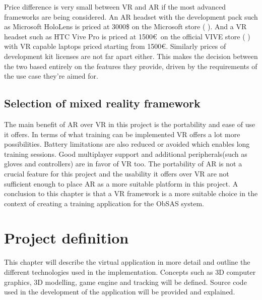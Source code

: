 \documentclass[12pt, a4paper,oneside, nocenter]{thesis}
\newcommand{\citeyeartitlexamkinline}[1]{(\usebibentry{#1}{title} \citeyear{#1})}
\begin{document}
\par
Price difference is very small between VR and AR if the most advanced frameworks are being considered. An AR headset with the development pack such as Microsoft HoloLens is priced at 3000\$ on the Microsoft store \citeyeartitlexamkinline{hololens-price}. And a VR headset such as HTC Vive Pro is priced at 1500\euro\ on the official VIVE store \citeyeartitlexamkinline{htc-vive-pro} with VR capable laptops priced starting from 1500\euro. Similarly prices of development kit licenses are not far apart either. This makes the decision between the two based entirely on the features they provide, driven by the requirements of the use case they're aimed for.
\par
\section{Selection of mixed reality framework}
The main benefit of AR over VR in this project is the portability and ease of use it offers. In terms of what training can be implemented VR offers a lot more possibilities. Battery limitations are also reduced or avoided which enables long training sessions. Good multiplayer support and additional peripherals(such as gloves and controllers) are in favor of VR too. The portability of AR is not a crucial feature for this project and the usability it offers over VR are not sufficient enough to place AR as a more suitable platform in this project. A conclusion to this chapter is that a VR framework is a more suitable choice in the context of creating a training application for the ObSAS system.
\par
\chapter{\texorpdfstring{Project definition}{proj-def}}
This chapter will describe the virtual application in more detail and outline the different technologies used in the implementation. Concepts such as 3D computer graphics, 3D modelling, game engine and tracking will be defined. Source code used in the development of the application will be provided and explained.
\par
\end{document}
